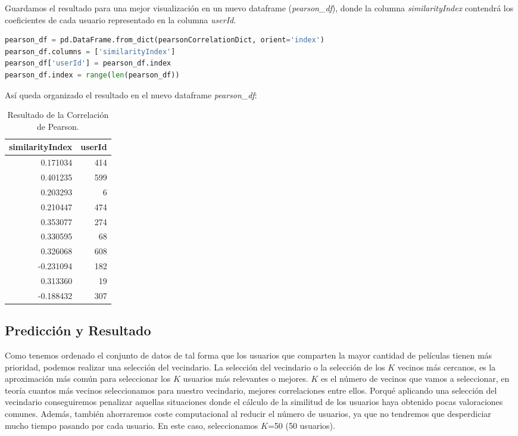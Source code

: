 \documentclass{uimppracticas}
\begin{document}
Guardamos el resultado para una mejor visualización en un nuevo dataframe (\textit{pearson\_df}), donde la columna \textit{similarityIndex} contendrá los coeficientes de cada usuario representado en la columna \textit{userId}.

\begin{lstlisting}[language=python, basicstyle=\small]
pearson_df = pd.DataFrame.from_dict(pearsonCorrelationDict, orient='index')
pearson_df.columns = ['similarityIndex']
pearson_df['userId'] = pearson_df.index
pearson_df.index = range(len(pearson_df))
\end{lstlisting}

\newpage

Así queda organizado el resultado en el nuevo dataframe \textit{pearson\_df}:

\begin{table}[H]
	\centering
	\begin{tabular}{rr}
		\toprule
		similarityIndex &  userId \\
		\midrule
		0.171034 &     414 \\
		0.401235 &     599 \\
		0.203293 &       6 \\
		0.210447 &     474 \\
		0.353077 &     274 \\
		0.330595 &      68 \\
		0.326068 &     608 \\
		-0.231094 &     182 \\
		0.313360 &      19 \\
		-0.188432 &     307 \\
		\bottomrule
	\end{tabular}
	\caption{Resultado de la Correlación de Pearson.}
\label{pearson_df}
\end{table}


\subsection{Predicción y Resultado}

Como tenemos ordenado el conjunto de datos de tal forma que los usuarios que comparten la mayor cantidad de películas tienen más prioridad, podemos realizar una selección del vecindario. La selección del vecindario o la selección de los $K$ vecinos más cercanos, es la aproximación más común para seleccionar los $K$ usuarios más relevantes o mejores. $K$ es el número de vecinos que vamos a seleccionar, en teoría cuantos más vecinos seleccionamos para nuestro vecindario, mejores correlaciones entre ellos. Porqué aplicando una selección del vecindario conseguiremos penalizar aquellas situaciones donde el cálculo de la similitud de los usuarios haya obtenido pocas valoraciones comunes. Además, también ahorraremos coste computacional al reducir el número de usuarios, ya que no tendremos que desperdiciar mucho tiempo pasando por cada usuario. En este caso, seleccionamos $K$=50 (50 usuarios).
\end{document}
